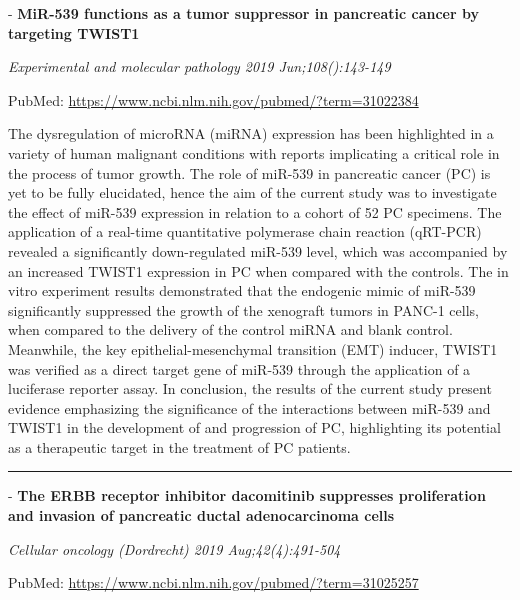 \documentclass[]{article}
\begin{document}
 - \textbf{MiR-539 functions as a tumor suppressor in pancreatic cancer
by targeting TWIST1}

\emph{Experimental and molecular pathology 2019 Jun;108():143-149}

PubMed: \url{https://www.ncbi.nlm.nih.gov/pubmed/?term=31022384}

The dysregulation of microRNA (miRNA) expression has been highlighted in
a variety of human malignant conditions with reports implicating a
critical role in the process of tumor growth. The role of miR-539 in
pancreatic cancer (PC) is yet to be fully elucidated, hence the aim of
the current study was to investigate the effect of miR-539 expression in
relation to a cohort of 52 PC specimens. The application of a real-time
quantitative polymerase chain reaction (qRT-PCR) revealed a
significantly down-regulated miR-539 level, which was accompanied by an
increased TWIST1 expression in PC when compared with the controls. The
in vitro experiment results demonstrated that the endogenic mimic of
miR-539 significantly suppressed the growth of the xenograft tumors in
PANC-1 cells, when compared to the delivery of the control miRNA and
blank control. Meanwhile, the key epithelial-mesenchymal transition
(EMT) inducer, TWIST1 was verified as a direct target gene of miR-539
through the application of a luciferase reporter assay. In conclusion,
the results of the current study present evidence emphasizing the
significance of the interactions between miR-539 and TWIST1 in the
development of and progression of PC, highlighting its potential as a
therapeutic target in the treatment of PC patients.

{}

{}

\begin{center}\rule{0.5\linewidth}{\linethickness}\end{center}

 - \textbf{The ERBB receptor inhibitor dacomitinib suppresses
proliferation and invasion of pancreatic ductal adenocarcinoma cells}

\emph{Cellular oncology (Dordrecht) 2019 Aug;42(4):491-504}

PubMed: \url{https://www.ncbi.nlm.nih.gov/pubmed/?term=31025257}
\end{document}

